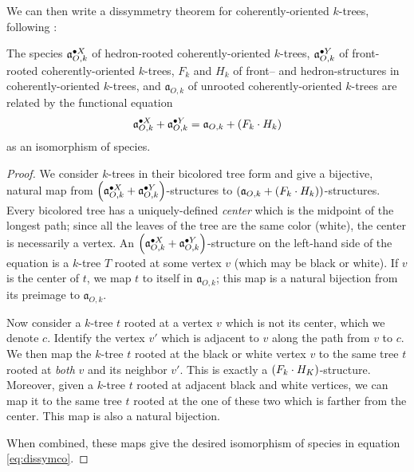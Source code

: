\documentclass[sectionflow,singlespace,twoside,boldmathhdr]{brandiss} %
\numberwithin{section}{chapter}
\numberwithin{figure}{chapter}
\begin{document}
We can then write a dissymmetry theorem for coherently-oriented $k$-trees, following \cite[\S 3.2, eq.\ (54)]{bll:species}:
\begin{theorem}
  \label{thm:dissymco}
  The species $\pointed[X]{\mathfrak{a}}_{O, k}$ of hedron-rooted coherently-oriented $k$-trees, $\pointed[Y]{\mathfrak{a}}_{O, k}$ of front-rooted coherently-oriented $k$-trees, $F_{k}$ and $H_{k}$ of front-- and hedron-structures in coherently-oriented $k$-trees, and $\mathfrak{a}_{O, k}$ of unrooted coherently-oriented $k$-trees are related by the functional equation
  \begin{equation}
    \label{eq:dissymco}
    \pointed[X]{\mathfrak{a}}_{O, k} + \pointed[Y]{\mathfrak{a}}_{O, k} = \mathfrak{a}_{O, k} + \pbrac{F_{k} \cdot H_{k}}
  \end{equation}
  as an isomorphism of species.
\end{theorem}

\begin{proof}
  We consider $k$-trees in their bicolored tree form and give a bijective, natural map from $\pbrac{\pointed[X]{\mathfrak{a}}_{O, k} + \pointed[Y]{\mathfrak{a}}_{O, k}}$-structures to $\pbrac{\mathfrak{a}_{O, k} + \pbrac{F_{k} \cdot H_{k}}}$-structures.
  Every bicolored tree has a uniquely-defined \emph{center} which is the midpoint of the longest path; since all the leaves of the tree are the same color (white), the center is necessarily a vertex.
  An $\pbrac{\pointed[X]{\mathfrak{a}}_{O, k} + \pointed[Y]{\mathfrak{a}}_{O, k}}$-structure on the left-hand side of the equation is a $k$-tree $T$ rooted at some vertex $v$ (which may be black or white).
  If $v$ is the center of $t$, we map $t$ to itself in $\mathfrak{a}_{O, k}$; this map is a natural bijection from its preimage to $\mathfrak{a}_{O, k}$.

  Now consider a $k$-tree $t$ rooted at a vertex $v$ which is not its center, which we denote $c$.
  Identify the vertex $v'$ which is adjacent to $v$ along the path from $v$ to $c$.
  We then map the $k$-tree $t$ rooted at the black or white vertex $v$ to the same tree $t$ rooted at \emph{both} $v$ and its neighbor $v'$.
  This is exactly a $\pbrac{F_{k} \cdot H_{K}}$-structure.
  Moreover, given a $k$-tree $t$ rooted at adjacent black and white vertices, we can map it to the same tree $t$ rooted at the one of these two which is farther from the center.
  This map is also a natural bijection.

  When combined, these maps give the desired isomorphism of species in equation \eqref{eq:dissymco}.
\end{proof}
\end{document}

